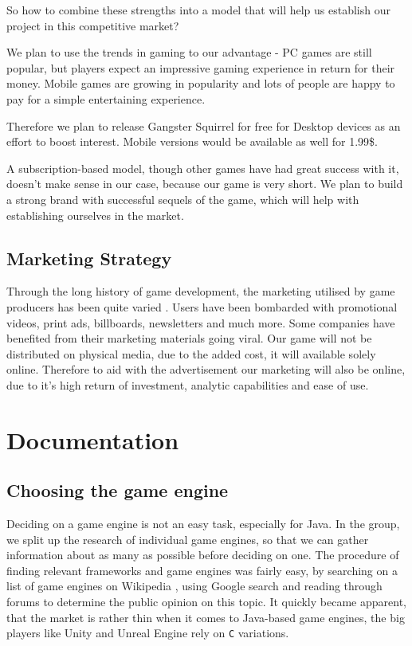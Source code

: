 \documentclass[12p]{article}
\begin{document}
So how to combine these strengths into a model that will help us establish our project in this competitive market?

We plan to use the trends in gaming to our advantage - PC games are still popular, but players expect an impressive gaming experience in return for their money. Mobile games are growing in popularity and lots of people are happy to pay for a simple entertaining experience.

Therefore we plan to release Gangster Squirrel for free for Desktop devices as an effort to boost interest. Mobile versions would be available as well for 1.99\$.

A subscription-based model, though other games have had great success with it, doesn’t make sense in our case, because our game is very short. We plan to build a strong brand with successful sequels of the game, which will help with establishing ourselves in the market.

\subsection{Marketing Strategy}
Through the long history of game development, the marketing utilised by game producers has been quite varied \cite{MarketingStrategyExamples}. Users have been bombarded with promotional videos, print ads, billboards, newsletters and much more. Some companies have benefited from their marketing materials going viral.
Our game will not be distributed on physical media, due to the added cost, it will available solely online. Therefore to aid with the advertisement our marketing will also be online, due to it's high return of investment, analytic capabilities and ease of use.


\newpage
\section{Documentation}


\subsection{Choosing the game engine} \label{DocGameEngine}

Deciding on a game engine is not an easy task, especially for Java. In the group, we split up the research of individual game engines, so that we can gather information about as many as possible before deciding on one. The procedure of finding relevant frameworks and game engines was fairly easy, by searching on a list of game engines on Wikipedia \cite{ListOfGameEngines}, using Google search and reading through forums to determine the public opinion on this topic. It quickly became apparent, that the market is rather thin when it comes to Java-based game engines, the big players like Unity \cite{UnityGameEngine} and Unreal Engine \cite{UnrealEngine} rely on \texttt{C} variations.
\end{document}
